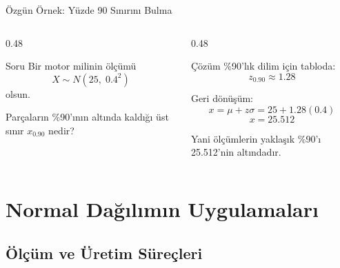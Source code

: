 \documentclass[light]{lutbeamer}
\begin{document}
\begin{frame}{Özgün Örnek: Yüzde 90 Sınırını Bulma}
\small
\begin{columns}[T,onlytextwidth]
    \begin{column}{0.48\textwidth}
        \begin{block}{Soru}
            Bir motor milinin ölçümü
            \[
            X \sim N(25,\;0.4^2)
            \]
            olsun.

            \vspace{0.15cm}
            Parçaların \%90'ının altında kaldığı üst sınır $x_{0.90}$ nedir?
        \end{block}
    \end{column}
    \begin{column}{0.48\textwidth}
        \begin{exampleblock}{Çözüm}
            \%90'lık dilim için tabloda:
            \[
            z_{0.90}\approx 1.28
            \]

            Geri dönüşüm:
            \[
            x=\mu+z\sigma=25+1.28(0.4)
            \]
            \[
            x=25.512
            \]

            Yani ölçümlerin yaklaşık \%90'ı 25.512'nin altındadır.
        \end{exampleblock}
    \end{column}
\end{columns}
\end{frame}

\section{Normal Dağılımın Uygulamaları}
\subsection{Ölçüm ve Üretim Süreçleri}
\end{document}
